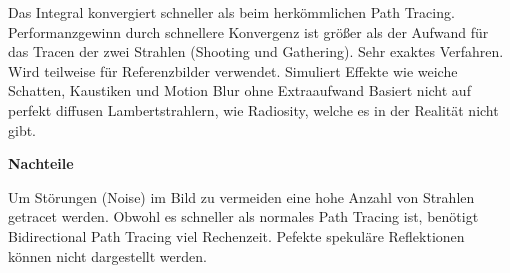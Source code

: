 \documentclass[a4paper,headings=small]{scrartcl}
\numberwithin{equation}{section} %
\numberwithin{figure}{section}   %
\begin{document}
Das Integral konvergiert schneller als beim herkömmlichen Path Tracing.
Performanzgewinn durch schnellere Konvergenz ist größer als der Aufwand für das Tracen der zwei Strahlen (Shooting und Gathering).
Sehr exaktes Verfahren. Wird teilweise für Referenzbilder verwendet.
Simuliert Effekte wie weiche Schatten, Kaustiken und Motion Blur ohne Extraaufwand
Basiert nicht auf perfekt diffusen Lambertstrahlern, wie Radiosity, welche es in der Realität nicht gibt.

\textbf{Nachteile}

Um Störungen (Noise) im Bild zu vermeiden eine hohe Anzahl von Strahlen getracet werden.
Obwohl es schneller als normales Path Tracing ist, benötigt Bidirectional Path Tracing viel Rechenzeit.
Pefekte spekuläre Reflektionen können nicht dargestellt werden.
\end{document}
